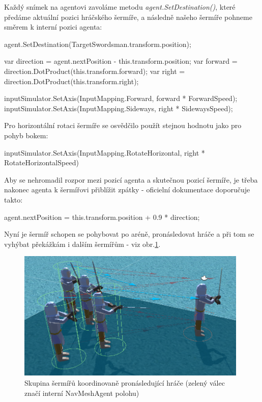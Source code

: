 Každý snímek na agentovi zavoláme metodu \textit{agent.SetDestination()}, které předáme aktuální pozici hráčského šermíře, a následně našeho šermíře pohneme směrem k interní pozici agenta:
\begin{code}
 agent.SetDestination(TargetSwordsman.transform.position);

 var direction = agent.nextPosition - this.transform.position;
 var forward = direction.DotProduct(this.transform.forward); 
 var right = direction.DotProduct(this.transform.right);
 
 inputSimulator.SetAxis(InputMapping.Forward, forward * ForwardSpeed);
 inputSimulator.SetAxis(InputMapping.Sideways, right * SidewaysSpeed);
\end{code}
Pro horizontální rotaci šermíře se osvědčilo použít stejnou hodnotu jako pro pohyb bokem:
\begin{code}
 inputSimulator.SetAxis(InputMapping.RotateHorizontal, 
                        right * RotateHorizontalSpeed)
\end{code}
Aby se nehromadil rozpor mezi pozicí agenta a skutečnou pozicí šermíře, je třeba nakonec agenta k šermířovi přiblížit zpátky - oficielní dokumentace doporučuje takto:
\begin{code}
 agent.nextPosition = this.transform.position + 0.9 * direction;
\end{code} 

Nyní je šermíř schopen se pohybovat po aréně, pronásledovat hráče a při tom se vyhýbat překážkám i dalším šermířům - viz obr.\ref{obr05:demogameAiNavigation}.

\begin{figure}[h!]\centering
  \center
  \includegraphics[width=110mm]{../img/demogameAiNavigation.png}
  \caption{Skupina šermířů koordinovaně pronásledující hráče (zelený válec značí interní NavMeshAgent polohu)}
  \label{obr05:demogameAiNavigation}
\end{figure} 


